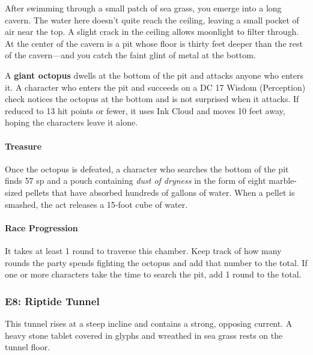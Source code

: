 \documentclass[a4paper, 11pt, bg=full, twocolumn, nooutline]{dndbook}
\begin{document}
\begin{DndReadAloud}
After swimming through a small patch of sea grass, you emerge into a long cavern. The water here doesn't quite reach the ceiling, leaving a small pocket of air near the top. A slight crack in the ceiling allows moonlight to filter through. At the center of the cavern is a pit whose floor is thirty feet deeper than the rest of the cavern---and you catch the faint glint of metal at the bottom.
\end{DndReadAloud}

A \textbf{giant octopus} dwells at the bottom of the pit and attacks anyone who enters it. A character who enters the pit and succeeds on a DC 17 Wisdom (Perception) check notices the octopus at the bottom and is not surprised when it attacks. If reduced to 13 hit points or fewer, it uses Ink Cloud and moves 10 feet away, hoping the characters leave it alone.

\paragraph{Treasure}

Once the octopus is defeated, a character who searches the bottom of the pit finds 57 sp and a pouch containing \textit{dust of dryness} in the form of eight marble-sized pellets that have absorbed hundreds of gallons of water. When a pellet is smashed, the act releases a 15-foot cube of water.

\paragraph{Race Progression}

It takes at least 1 round to traverse this chamber. Keep track of how many rounds the party spends fighting the octopus and add that number to the total. If one or more characters take the time to search the pit, add 1 round to the total.


\subsubsection{E8: Riptide Tunnel}

\begin{DndReadAloud}
This tunnel rises at a steep incline and contains a strong, opposing current. A heavy stone tablet covered in glyphs and wreathed in sea grass rests on the tunnel floor.
\end{DndReadAloud}
\end{document}
